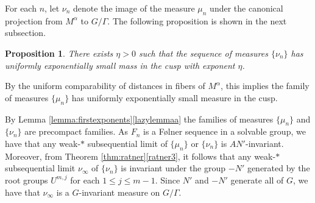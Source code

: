 \documentclass[10pt,reqno]{amsart}
\theoremstyle{Theorem}
\newtheorem{proposition}[theorem]{Proposition}
\theoremstyle{definition}
\theoremstyle{remark}
\def\Folner{F{\o}lner }
\begin{document}
For each $n$, let $\nu_n$ denote the image of the measure $\mu_n$ under the canonical projection from  $M^\alpha$ to $G/\Gamma$.
The following proposition is  shown in the next subsection.
\begin{proposition}\label{maincusps}
There exists $\eta>0$ such that the sequence of measures $\{\nu_n\}$ has uniformly exponentially small mass in the cusp with exponent $\eta$.
\end{proposition}
By the uniform comparability of distances in fibers of $M^\alpha$, this implies the family of measures $\{ \mu_n\}$ has uniformly exponentially  small measure in the  cusp.


By Lemma \ref{lemma:firstexponents}\ref{lazylemmaa} the families of measures    $\{\mu_n\}$  and $\{\nu_n\}$ are precompact families.
 As $F_n$ is a \Folner sequence in a solvable group, we have that
any weak-$*$ subsequential limit  of  $\{\mu _n\}$  or $\{\nu_n\}$   is  $AN'$-invariant.
Moreover, from Theorem \ref{thm:ratner}\ref{ratner3}, it follows that any  weak-$*$ subsequential limit $\nu_\infty$ of $\{\nu_n\}$ is invariant under the group $-N'$ generated by the root groups $U^{m,j}$ for each $1\le j\le m-1$.  Since $N'$ and $-N'$ generate all of $G$, we have that $\nu_\infty$ is a $G$-invariant measure on $G/\Gamma$.
\end{document}
